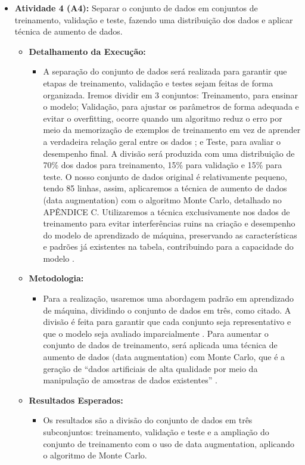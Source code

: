 \begin{itemize}
\begin{itemize}
      \item \textbf{Atividade 4 (A4):} Separar o conjunto de dados em conjuntos de treinamento, validação e teste, fazendo uma distribuição dos dados e aplicar técnica de aumento de dados.
      \begin{itemize}
        \item \textbf{Detalhamento da Execução:} 
        \begin{itemize}
          \item A separação do conjunto de dados será realizada para garantir que etapas de treinamento, validação e testes sejam feitas de forma organizada. Iremos dividir em 3 conjuntos: Treinamento, para ensinar o modelo; Validação, para ajustar os parâmetros de forma adequada e evitar o overfitting, ocorre quando um algoritmo reduz o erro por meio da memorização de exemplos de treinamento em vez de aprender a verdadeira relação geral entre os dados \cite{bashir2020}; e Teste, para avaliar o desempenho final. A divisão será produzida com uma distribuição de 70\% dos dados para treinamento, 15\% para validação e 15\% para teste. O nosso conjunto de dados original é relativamente pequeno, tendo 85 linhas, assim, aplicaremos a técnica de aumento de dados (data augmentation) com o algoritmo Monte Carlo, detalhado no APÊNDICE C.  Utilizaremos a técnica exclusivamente nos dados de treinamento para evitar interferências ruins na criação e desempenho do modelo de aprendizado de máquina, preservando as características e padrões já existentes na tabela, contribuindo para a capacidade do modelo \cite{kiar2021}. 
        \end{itemize}

        \item \textbf{Metodologia:} 
        \begin{itemize}
          \item Para a realização, usaremos uma abordagem padrão em aprendizado de máquina, dividindo o conjunto de dados em três, como citado. A divisão é feita para garantir que cada conjunto seja representativo e que o modelo seja avaliado imparcialmente \cite{bashir2020}. Para aumentar o conjunto de dados de treinamento, será aplicada uma técnica de aumento de dados (data augmentation) com Monte Carlo, que é a geração de “dados artificiais de alta qualidade por meio da manipulação de amostras de dados existentes” \cite{wang2019}. 
        \end{itemize}

        \item \textbf{Resultados Esperados:} 
        \begin{itemize}
          \item Os resultados são a divisão do conjunto de dados em três subconjuntos: treinamento, validação e teste e a ampliação do conjunto de treinamento com o uso de data augmentation, aplicando o algoritmo de Monte Carlo. 
        \end{itemize}
      \end{itemize}
  \end{itemize}
\end{itemize}

